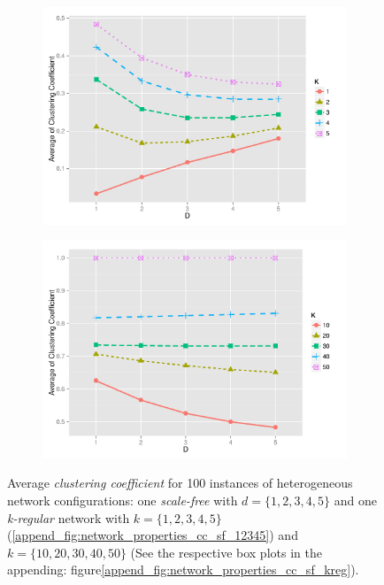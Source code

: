 \documentclass[preprint,number]{elsarticle}
\begin{document}
\begin{figure}[H]
	\centering
	\begin{subfigure}{.5\linewidth}
		\centering
		\includegraphics[width=1\linewidth]{"../analysis/pdf/network_properties_cc_line_sf_kreg_12345"}
		\caption{}
		\label{fig:network_properties_cc_line_sf_kreg_12345}
	\end{subfigure}%
	\begin{subfigure}{.5\linewidth}
		\centering
		\includegraphics[width=1\linewidth]{"../analysis/pdf/network_properties_cc_line_sf_kreg_1020304050"}
		\caption{}
		\label{fig:network_properties_cc_line_sf_kreg_1020304050}
	\end{subfigure}
	\begin{minipage}{0.9\textwidth}
		\vspace{0.2cm}
		\caption{Average \textit{clustering coefficient} for 100 instances of heterogeneous network configurations:  one \textit{scale-free} with $d=\{1,2,3,4,5\}$ and one \textit{k-regular} network with $k=\{1,2,3,4,5\}$  (\ref{append_fig:network_properties_cc_sf_12345}) and $k=\{10,20,30,40,50\} $ (See the respective box plots in the appending: figure\ref{append_fig:network_properties_cc_sf_kreg}).}
		\label{fig:network_properties_line_cc_sf_kreg}
	\end{minipage}
\end{figure}
\end{document}
